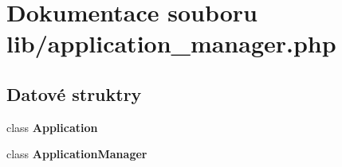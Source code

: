 \section{Dokumentace souboru lib/application\_\-manager.php}
\label{d2/d27/application__manager_8php}
\subsection*{Datové struktry}
\begin{DoxyCompactItemize}
\item 
class {\bf Application}
\item 
class {\bf ApplicationManager}
\end{DoxyCompactItemize}
